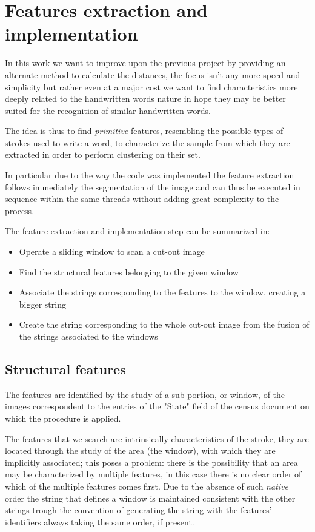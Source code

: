 \section{Features extraction and implementation}

In this work we want to improve upon the previous project by providing an alternate method to calculate the distances, the focus isn't any more speed and simplicity but rather even at a major cost we want to find characteristics more deeply related to the handwritten words nature in hope they may be better suited for the recognition of similar handwritten words.

The idea is thus to find \emph{primitive} features, resembling the possible types of strokes used to write a word, to characterize the sample from which they are extracted in order to perform clustering on their set.

In particular due to the way the code was implemented the feature extraction follows immediately the segmentation of the image and can thus be executed in sequence within the same threads without adding great complexity to the process.

\vspace{2mm}

The feature extraction and implementation step can be summarized in:
\begin{itemize}
\item Operate a sliding window to scan a cut-out image
\item Find the structural features belonging to the given window
\item Associate the strings corresponding to the features to the window, creating a bigger string
\item Create the string corresponding to the whole cut-out image from the fusion of the strings associated to the windows
\end{itemize}

\subsection{Structural features}

The features are identified by the study of a sub-portion, or window, of the images correspondent to the entries of the "State" field of the census document on which the procedure is applied.

The features that we search are intrinsically characteristics of the stroke, they are located through the study of the area (the window), with which they are implicitly associated; this poses a problem: there is the possibility that an area may be characterized by multiple features, in this case there is no clear order of which of the multiple features comes first.
Due to the absence of such \emph{native} order the string that defines a window is maintained consistent with the other strings trough the convention of generating the string with the features' identifiers always taking the same order, if present.

